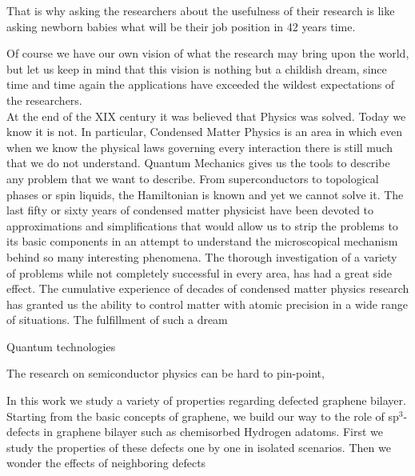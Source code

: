 That is why asking the researchers about the usefulness of their research is like asking newborn babies what will be their job position in 42 years time.

Of course we have our own vision of what the research may bring upon the world, but let us keep in mind that this vision is nothing but a childish dream, since time and time again the applications have exceeded the wildest expectations of the researchers.\\


At the end of the XIX century it was believed that Physics was solved. Today we know it is not. In particular, Condensed Matter Physics is an area in which even when we know the physical laws governing every interaction there is still much that we do not understand. Quantum Mechanics gives us the tools to describe any problem that we want to describe. From superconductors to topological phases or spin liquids, the Hamiltonian is known and yet we cannot solve it. The last fifty or sixty years of condensed matter physicist have been devoted to approximations and simplifications that would allow us to strip the problems to its basic components in an attempt to understand the microscopical mechanism behind so many interesting phenomena.
The thorough investigation of a variety of problems while not completely successful in every area, has had a great side effect. The cumulative experience of decades of condensed matter physics research has granted us the ability to control matter with atomic precision in a wide range of situations. The fulfillment of such a dream\cite{Feynman1982}

Quantum technologies\cite{QTF}

The research on semiconductor physics can be hard to pin-point, 


In this work we study a variety of properties regarding defected graphene bilayer. Starting from the basic concepts of graphene, we build our way to the role of sp$^3$-defects in graphene bilayer such as chemisorbed Hydrogen adatoms.
First we study the properties of these defects one by one in isolated scenarios. Then we wonder the effects of neighboring defects
